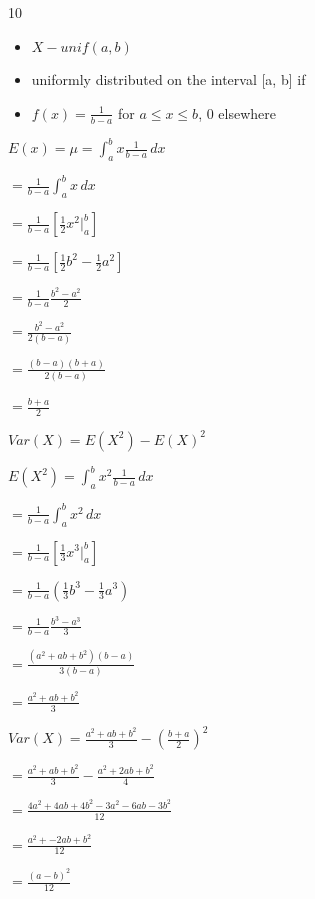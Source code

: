 \documentclass[12 pt]{article}
\begin{document}
    \begin{exercise}{10}
    \hfill

    \begin{itemize}
        \item $X - unif(a, b)$
        \item uniformly distributed on the interval [a, b] if
        \item $f(x) = \frac{1}{b - a}$ for $a \leq x \leq b$, 0 elsewhere
    \end{itemize}

    $E(x) = \mu = \int_{a}^{b} x \frac{1}{b-a} \, dx$

    $= \frac{1}{b-a} \int_{a}^{b} x \, dx$

    $= \frac{1}{b - a} [\frac{1}{2} x^2 |_{a}^{b}]$

    $= \frac{1}{b-a}[\frac{1}{2} b^2 - \frac{1}{2} a^2]$

    $= \frac{1}{b-a} \frac{b^2 - a^2}{2}$

    $= \frac{b^2 - a^2}{2(b-a)}$

    $= \frac{(b-a)(b+a)}{2(b-a)}$

    $= \frac{b+a}{2}$

    \hfill

    $Var(X) = E(X^2) - E(X)^2$

    \hfill

    $E(X^2) = \int_{a}^{b} x^2 \frac{1}{b-a} \, dx$

    $= \frac{1}{b-a} \int_{a}^{b} x^2 \, dx$

    $= \frac{1}{b-a} [\frac{1}{3} x^3 |_{a}^{b}]$

    $= \frac{1}{b-a}(\frac{1}{3} b^3 - \frac{1}{3} a^3)$

    $= \frac{1}{b-a} \frac{b^3 - a^3}{3}$

    $= \frac{(a^2 + ab + b^2)(b-a)}{3(b-a)}$

    $= \frac{a^2 + ab + b^2}{3}$

    \hfill

    $Var(X) = \frac{a^2 + ab + b^2}{3} - (\frac{b+a}{2})^2$

    $= \frac{a^2 + ab + b^2}{3} - \frac{a^2 + 2ab + b^2}{4}$

    $= \frac{4a^2 + 4ab + 4b^2 - 3a^2 - 6ab - 3b^2}{12}$

    $= \frac{a^2 + -2ab + b^2}{12}$

    $= \frac{(a-b)^2}{12}$

    \hfill   
    \end{exercise}
\end{document}

